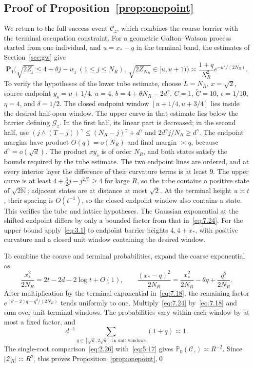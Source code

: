 \documentclass[11pt,a4paper]{article}
\numberwithin{equation}{section}
\theoremstyle{remark}
\begin{document}
\subsection{Proof of Proposition~\ref{prop:onepoint}}\label{sec:coarseonepoint}\label{sec:firstmomentcompletion}
We return to the full success event $\mathcal C_z$, which combines the coarse barrier with the terminal occupation constraint. For a geometric Galton--Watson process started from one individual, and $u=x_*-q$ in the terminal band, the estimates of Section~\ref{sec:gw} give
\begin{equation}\label{eq:7.24}
\mathbf P_1\bigl(\sqrt{2Z_j}\le4+\theta j-w_j\ (1\le j\le N_R),
\ \sqrt{2Z_{N_R}}\in[u,u+1)\bigr)
\asymp\frac{1+q}{N_R^2}e^{-u^2/(2N_R)}.
\end{equation}
To verify the hypotheses of the lower tube estimate, choose
$L=N_R$, $x=\sqrt2$, source endpoint $y_s=u+1/4$,
$a=4$, $b=4+\theta N_R-2d^\gamma$, $C=1$, $\widetilde C=10$,
$\epsilon=1/10$, $\eta=4$, and $\delta=1/2$.
The closed endpoint window $[u+1/4,u+3/4]$ lies inside the desired half-open window.
The upper curve in that estimate lies below the barrier defining $\mathcal G_z$. In the first half, its linear part is decreased; in the second half, use
$(j\wedge(T-j))^\gamma\le(N_R-j)^\gamma+d^\gamma$ and
$2d^\gamma j/N_R\ge d^\gamma$.
The endpoint margins have product $O(q)=o(N_R)$ and final margin $\asymp q$, because $d^\gamma=o(\sqrt d)$. The product $xy_s$ is of order $N_R$, and both states satisfy the bounds required by the tube estimate.
The two endpoint lines are ordered, and at every interior layer the difference of their curvature terms is at least $9$. The upper curve is at least $4+\tfrac32j-j^{2/5}\ge4$ for large $R$, so the tube contains a positive state of $\sqrt{2\mathbb N}$; adjacent states are at distance at most $\sqrt2$.
At the terminal height $u\asymp t$, their spacing is $O(t^{-1})$, so the closed endpoint window also contains a state. This verifies the tube and lattice hypotheses. The Gaussian exponential at the shifted endpoint differs by only a bounded factor from that in~\eqref{eq:7.24}.
For the upper bound apply~\eqref{eq:3.1} to endpoint barrier heights $4,4+x_*$, with positive curvature and a closed unit window containing the desired window.

To combine the coarse and terminal probabilities, expand the coarse exponential as
\begin{equation}\label{eq:7.26}
\frac{x_*^2}{2N_R}=2t-2d-2\log t+O(1),\qquad
\frac{(x_*-q)^2}{2N_R}=\frac{x_*^2}{2N_R}-\theta q+\frac{q^2}{2N_R}.
\end{equation}
After multiplication by the terminal exponential in~\eqref{eq:7.18}, the remaining factor $e^{(\theta-2)q-q^2/(2N_R)}$ tends uniformly to one.
Multiply~\eqref{eq:7.24} by~\eqref{eq:7.18} and sum over unit terminal windows. The probabilities vary within each window by at most a fixed factor, and
\begin{equation}\label{eq:7.27}
d^{-1}\sum_{q\in[\sqrt d,2\sqrt d]\text{ in unit windows}}(1+q)\asymp1.
\end{equation}
The single-root comparison~\eqref{eq:2.26} with~\eqref{eq:5.17} gives
$\mathbb P_0(\mathcal C_z)\asymp R^{-2}$. Since $|\mathscr Z_R|\asymp R^2$, this proves Proposition~\ref{prop:onepoint}.\qed
\end{document}
